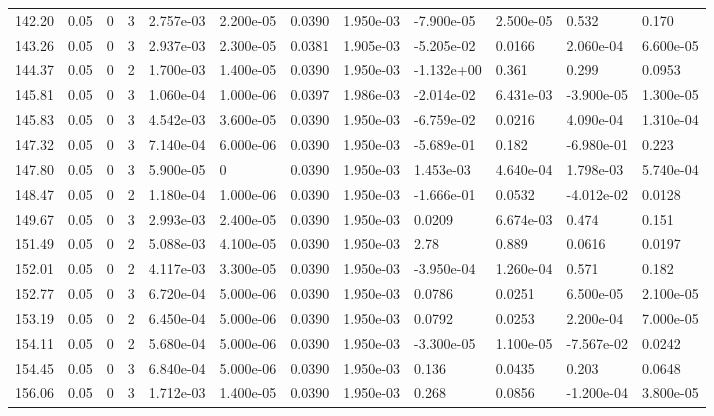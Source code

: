 \documentclass[preview]{standalone}
\begin{document}
{{{{{{\begin{tabular}{L{1.2cm}C{1.2cm} C{0.3cm}C{0.5cm} C{1.4cm}C{1.4cm} C{1.4cm}C{1.4cm} C{1.6cm}C{1.6cm} C{1.6cm}C{1.6cm}}
  142.20  &  0.05  & 0     &  3 &  2.757e-03  & 2.200e-05  &  0.0390&   1.950e-03& -7.900e-05 & 2.500e-05   &  0.532 & 0.170  \\ 
  143.26  &  0.05  & 0     &  3 &  2.937e-03  & 2.300e-05  &  0.0381&   1.905e-03& -5.205e-02 & 0.0166   &  2.060e-04 & 6.600e-05  \\ 
  144.37  &  0.05  & 0     &  2 &  1.700e-03  & 1.400e-05  &  0.0390&   1.950e-03& -1.132e+00 & 0.361   &  0.299 & 0.0953  \\ 
  145.81  &  0.05  & 0     &  3 &  1.060e-04  & 1.000e-06  &  0.0397&   1.986e-03& -2.014e-02 & 6.431e-03   &  -3.900e-05 & 1.300e-05  \\ 
  145.83  &  0.05  & 0     &  3 &  4.542e-03  & 3.600e-05  &  0.0390&   1.950e-03& -6.759e-02 & 0.0216   &  4.090e-04 & 1.310e-04  \\ 
  147.32  &  0.05  & 0     &  3 &  7.140e-04  & 6.000e-06  &  0.0390&   1.950e-03& -5.689e-01 & 0.182   &  -6.980e-01 & 0.223  \\ 
  147.80  &  0.05  & 0     &  3 &  5.900e-05  & 0  &  0.0390&   1.950e-03& 1.453e-03 & 4.640e-04   &  1.798e-03 & 5.740e-04  \\ 
  148.47  &  0.05  & 0     &  2 &  1.180e-04  & 1.000e-06  &  0.0390&   1.950e-03& -1.666e-01 & 0.0532   &  -4.012e-02 & 0.0128  \\ 
  149.67  &  0.05  & 0     &  3 &  2.993e-03  & 2.400e-05  &  0.0390&   1.950e-03& 0.0209 & 6.674e-03   &  0.474 & 0.151  \\ 
  151.49  &  0.05  & 0     &  2 &  5.088e-03  & 4.100e-05  &  0.0390&   1.950e-03& 2.78 & 0.889   &  0.0616 & 0.0197  \\ 
  152.01  &  0.05  & 0     &  2 &  4.117e-03  & 3.300e-05  &  0.0390&   1.950e-03& -3.950e-04 & 1.260e-04   &  0.571 & 0.182  \\ 
  152.77  &  0.05  & 0     &  3 &  6.720e-04  & 5.000e-06  &  0.0390&   1.950e-03& 0.0786 & 0.0251   &  6.500e-05 & 2.100e-05  \\ 
  153.19  &  0.05  & 0     &  2 &  6.450e-04  & 5.000e-06  &  0.0390&   1.950e-03& 0.0792 & 0.0253   &  2.200e-04 & 7.000e-05  \\ 
  154.11  &  0.05  & 0     &  2 &  5.680e-04  & 5.000e-06  &  0.0390&   1.950e-03& -3.300e-05 & 1.100e-05   &  -7.567e-02 & 0.0242  \\ 
  154.45  &  0.05  & 0     &  3 &  6.840e-04  & 5.000e-06  &  0.0390&   1.950e-03& 0.136 & 0.0435   &  0.203 & 0.0648  \\ 
  156.06  &  0.05  & 0     &  3 &  1.712e-03  & 1.400e-05  &  0.0390&   1.950e-03& 0.268 & 0.0856   &  -1.200e-04 & 3.800e-05  \\ 

\end{tabular}}}}}}}
\end{document}

